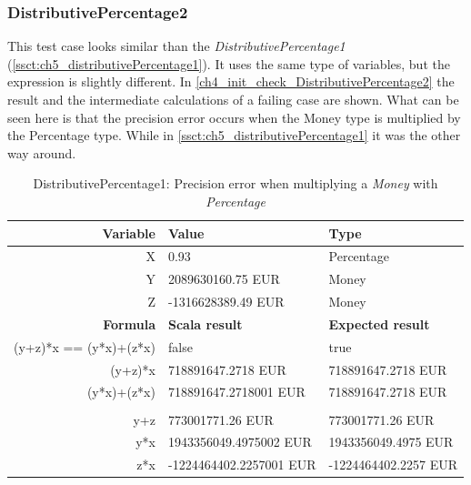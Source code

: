 \subsubsection{DistributivePercentage2}
This test case looks similar than the \textit{DistributivePercentage1} (\autoref{ssct:ch5_distributivePercentage1}). It uses the same type of variables, but the expression is slightly different. In \autoref{ch4_init_check_DistributivePercentage2} the result and the intermediate calculations of a failing case are shown. What can be seen here is that the precision error occurs when the Money type is multiplied by the Percentage type. While in \autoref{ssct:ch5_distributivePercentage1} it was the other way around.
\FloatBarrier
\begin{table}[!ht]
\centering
\begin{tabular}{rll}
\hline
\textbf{Variable}      & \textbf{Value}          & \textbf{Type}            \\ \hline
X                      & 0.93                    & Percentage               \\
Y                      & 2089630160.75 EUR       & Money                    \\
Z                      & -1316628389.49 EUR      & Money                    \\ \hline
\textbf{Formula}       & \textbf{Scala result}   & \textbf{Expected result} \\ \hline
(y+z)*x == (y*x)+(z*x) & false                   & true                     \\
(y+z)*x                & 718891647.2718 EUR      & 718891647.2718 EUR       \\
(y*x)+(z*x)            & 718891647.2718001 EUR   & 718891647.2718 EUR       \\
                       &                         &                          \\
y+z                    & 773001771.26 EUR        & 773001771.26 EUR         \\
y*x                    & 1943356049.4975002 EUR  & 1943356049.4975 EUR      \\
z*x                    & -1224464402.2257001 EUR & -1224464402.2257 EUR     \\ \hline
\end{tabular}
\caption{DistributivePercentage1: Precision error when multiplying a \textit{Money} with \textit{Percentage}}
\label{ch4_init_check_DistributivePercentage2}
\end{table}
\FloatBarrier

